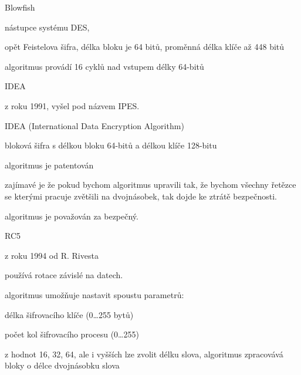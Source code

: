 \begin{obecne}{Blowfish}
  \begin{pitemize}
    \item nástupce systému DES, 
    \item opět Feistelova šifra, délka bloku je 64 bitů, proměnná délka klíče až 448 bitů
    \item algoritmus provádí 16 cyklů nad vstupem délky 64-bitů
  \end{pitemize}
\end{obecne}

\begin{obecne}{IDEA}
  \begin{pitemize}
    \item z roku 1991, vyšel pod názvem IPES. 
    \item IDEA (International Data Encryption Algorithm)
    \item bloková šifra s délkou bloku 64-bitů a délkou klíče 128-bitu
    \item algoritmus je patentován 
    \item zajímavé je že pokud bychom algoritmus upravili tak, že bychom všechny řetězce
    se kterými pracuje zvětšili na dvojnásobek, tak dojde ke ztrátě bezpečnosti.
    \item algoritmus je považován za bezpečný.
  \end{pitemize}
\end{obecne}

\begin{obecne}{RC5}
  \begin{pitemize}
    \item z roku 1994 od R. Rivesta
    \item používá rotace závislé na datech.
    \item algoritmus umožňuje nastavit spoustu parametrů:
    \begin{pitemize}
      \item délka šifrovacího klíče (0\dots255 bytů)
      \item počet kol šifrovacího procesu (0\dots255)
      \item z hodnot 16, 32, 64, ale i vyšších lze zvolit délku slova, algoritmus
      zpracovává bloky o délce dvojnásobku slova
    \end{pitemize}
  \end{pitemize}

\end{obecne}

